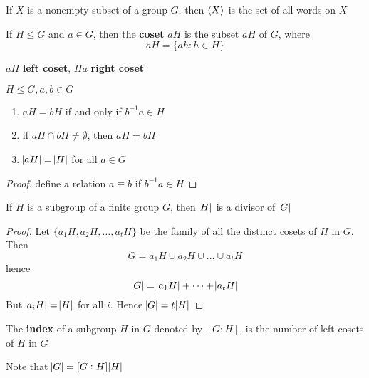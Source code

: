 \documentclass[11pt]{article}
\begin{document}
\begin{proposition}[]
If \(X\) is a nonempty subset of a group \(G\), then \(\langle X\rangle\) is the set of all
words on \(X\)
\end{proposition}

\begin{definition}[]
If \(H\le G\) and \(a\in G\), then the \textbf{coset} \(aH\) is the subset \(aH\) of \(G\),
where
\begin{equation*}
aH=\{ah:h\in H\}
\end{equation*}
\end{definition}
\(aH\) \textbf{left coset}, \(Ha\) \textbf{right coset}

\begin{lemma}[]
\(H\le G,a,b\in G\)
\begin{enumerate}
\item \(aH=bH\) if and only if \(b^{-1}a\in H\)
\item if \(aH\cap bH\neq\emptyset\), then \(aH=bH\)
\item \(\abs{aH}=\abs{H}\) for all \(a\in G\)
\end{enumerate}
\end{lemma}
\begin{proof}
define a relation \(a\equiv b\) if \(b^{-1}a\in H\)
\end{proof}


\begin{theorem}
If \(H\) is a subgroup of a finite group \(G\), then \(\abs{H}\) is a divisor of \(\abs{G}\)
\end{theorem}

\begin{proof}
Let \(\{a_1H,a_2H,\dots,a_tH\}\) be the family of all the distinct cosets of
\(H\) in \(G\). Then
\begin{equation*}
G=a_1H\cup a_2H\cup\dots\cup a_tH
\end{equation*}
hence
\begin{equation*}
\abs{G}=\abs{a_1H}+\dots+\abs{a_tH}
\end{equation*}
But \(\abs{a_iH}=\abs{H}\) for all \(i\). Hence \(\abs{G}=t\abs{H}\)
\end{proof}

\begin{definition}[]
The \textbf{index} of a subgroup \(H\) in \(G\) denoted by \([G:H]\), is the number of
left cosets of \(H\) in \(G\)
\end{definition}

Note that \(\abs{G}=[G:H]\abs{H}\)
\end{document}
